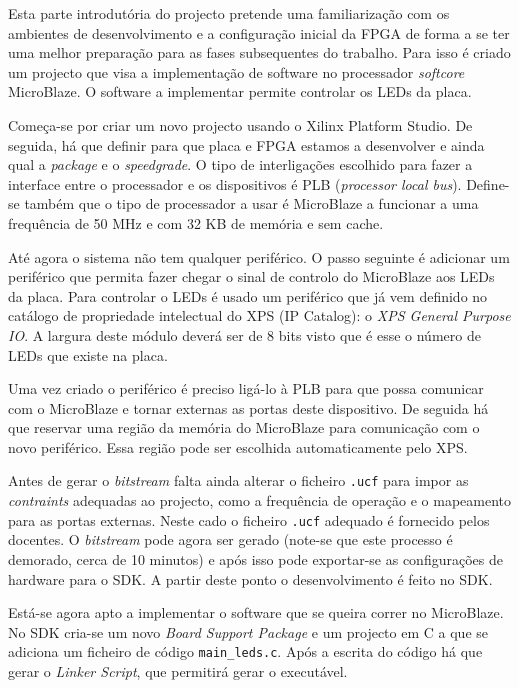 \documentclass[a4paper,12pt]{article}
\begin{document}
Esta parte introdutória do projecto pretende uma familiarização com os ambientes de desenvolvimento e a configuração inicial da FPGA de forma a se ter uma melhor preparação para as fases subsequentes do trabalho. Para isso é criado um projecto que visa a implementação de software no processador \textit{softcore} MicroBlaze. O software a implementar permite controlar os LEDs da placa.

Começa-se por criar um novo projecto usando o Xilinx Platform Studio. De seguida, há que definir para que placa e FPGA estamos a desenvolver e ainda qual a \textit{package} e o \textit{speedgrade}. O tipo de interligações escolhido para fazer a interface entre o processador e os dispositivos é PLB (\textit{processor local bus}). Define-se também que o tipo de processador a usar é MicroBlaze a funcionar a uma frequência de 50 MHz e com 32 KB de memória e sem cache.

Até agora o sistema não tem qualquer periférico. O passo seguinte é adicionar um periférico que permita fazer chegar o sinal de controlo do MicroBlaze aos LEDs da placa. Para controlar o LEDs é usado um periférico que já vem definido no catálogo de propriedade intelectual do XPS (IP Catalog): o \textit{XPS General Purpose IO}. A largura deste módulo deverá ser de 8 bits visto que é esse o número de LEDs que existe na placa.

Uma vez criado o periférico é preciso ligá-lo à PLB para que possa comunicar com o MicroBlaze e tornar externas as portas deste dispositivo. De seguida há que reservar uma região da memória do MicroBlaze para comunicação com o novo periférico. Essa região pode ser escolhida automaticamente pelo XPS.

Antes de gerar o \textit{bitstream} falta ainda alterar o ficheiro \texttt{.ucf} para impor as \textit{contraints} adequadas ao projecto, como a frequência de operação e o mapeamento para as portas externas. Neste cado o ficheiro \texttt{.ucf} adequado é fornecido pelos docentes. O \textit{bitstream} pode agora ser gerado (note-se que este processo é demorado, cerca de 10 minutos) e após isso pode exportar-se as configurações de hardware para o SDK. A partir deste ponto o desenvolvimento é feito no SDK.

Está-se agora apto a implementar o software que se queira correr no MicroBlaze. No SDK cria-se um novo \textit{Board Support Package} e um projecto em C a que se adiciona um ficheiro de código \texttt{main\_leds.c}. Após a escrita do código há que gerar o \textit{Linker Script}, que permitirá gerar o executável.
\end{document}
